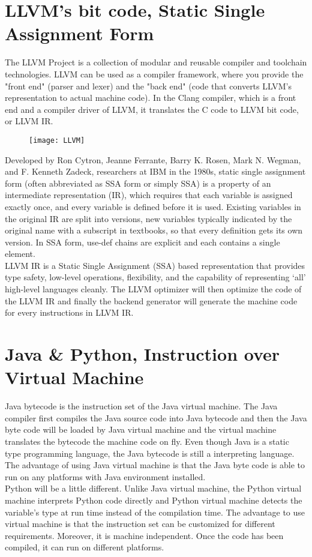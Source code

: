 \section{LLVM's bit code, Static Single Assignment Form}
The LLVM Project is a collection of modular and reusable compiler and toolchain technologies. LLVM can be used as a compiler framework, where you provide the "front end" (parser and lexer) and the "back end" (code that converts LLVM's representation to actual machine code). In the Clang compiler, which is a front end and a compiler driver of LLVM, it translates the C code to LLVM bit code, or LLVM IR. \\
\begin{figure}[h]
\centering
\texttt{[image: LLVM]}
\end{figure}
Developed by Ron Cytron, Jeanne Ferrante, Barry K. Rosen, Mark N. Wegman, and F. Kenneth Zadeck, researchers at IBM in the 1980s, static single assignment form (often abbreviated as SSA form or simply SSA) is a property of an intermediate representation (IR), which requires that each variable is assigned exactly once, and every variable is defined before it is used. Existing variables in the original IR are split into versions, new variables typically indicated by the original name with a subscript in textbooks, so that every definition gets its own version. In SSA form, use-def chains are explicit and each contains a single element. \\
LLVM IR is a Static Single Assignment (SSA) based representation that provides type safety, low-level operations, flexibility, and the capability of representing ‘all’ high-level languages cleanly. The LLVM optimizer will then optimize the code of the LLVM IR and finally the backend generator will generate the machine code for every instructions in LLVM IR. \\


\section{Java \& Python, Instruction over Virtual Machine}
Java bytecode is the instruction set of the Java virtual machine. The Java compiler first compiles the Java source code into Java bytecode and then the Java byte code will be loaded by Java virtual machine and the virtual machine translates the bytecode the machine code on fly. Even though Java is a static type programming language, the Java bytecode is still a interpreting language. The advantage of using Java virtual machine is that the Java byte code is able to run on any platforms with Java environment installed. \\
Python will be a little different. Unlike Java virtual machine, the Python virtual machine interprets Python code directly and Python virtual machine detects the variable's type at run time instead of the compilation time.
The advantage to use virtual machine is that the instruction set can be customized for different requirements. Moreover, it is machine independent. Once the code has been compiled, it can run on different platforms.
